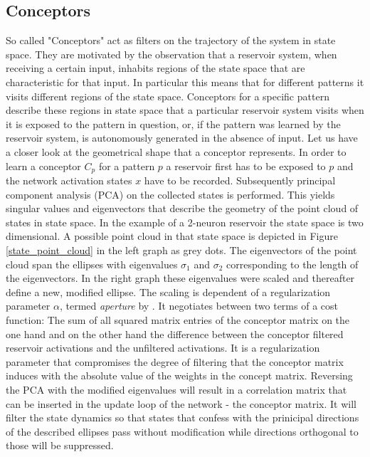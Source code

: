 \documentclass{frontiersSCNS} %
\begin{document}
\subsection{Conceptors}
    So called "Conceptors" act as filters on the trajectory of the system in state space.
    They are motivated by the observation that a reservoir system, when receiving a certain input, inhabits regions of the state space that are characteristic for that input. In particular this means that for different patterns it visits different regions of the state space. Conceptors for a specific pattern describe these regions in state space that a particular reservoir system visits when it is exposed to the pattern in question, or, if the pattern was learned by the reservoir system, is autonomously generated in the absence of input. Let us have a closer look at the geometrical shape that a conceptor represents. 
    In order to learn a conceptor $ C_p $ for a pattern $ p $ a reservoir first has to be exposed to $p$ and the network activation states $x$ have to be recorded. Subsequently principal component analysis (PCA) on the collected states is performed. This yields singular values and eigenvectors that describe the geometry of the point cloud of states in state space. In the example of a 2-neuron reservoir the state space is two dimensional. A possible point cloud in that state space is depicted in Figure \ref{state_point_cloud} in the left graph as grey dots. The eigenvectors of the point cloud span the ellipses with eigenvalues $ \sigma_1 $ and $ \sigma_2 $ corresponding to the length of the eigenvectors. In the right graph these eigenvalues were scaled and thereafter define a new, modified ellipse. The scaling is dependent of a regularization parameter $ \alpha  $, termed \textit{aperture} by \cite{Jaeger2014}. It negotiates between two terms of a cost function: The sum of all squared matrix entries of the conceptor matrix on the one hand and on the other hand the difference between the conceptor filtered reservoir activations and the unfiltered activations. It is a regularization parameter that compromises the degree of filtering that the conceptor matrix induces with the absolute value of the weights in the concept matrix. 
    Reversing the PCA with the modified eigenvalues will result in a correlation matrix that can be inserted in the update loop of the network - the conceptor matrix. It will filter the state dynamics so that states that confess with the prinicipal directions of the described ellipses pass without modification while directions orthogonal to those will be suppressed. 
\end{document}
